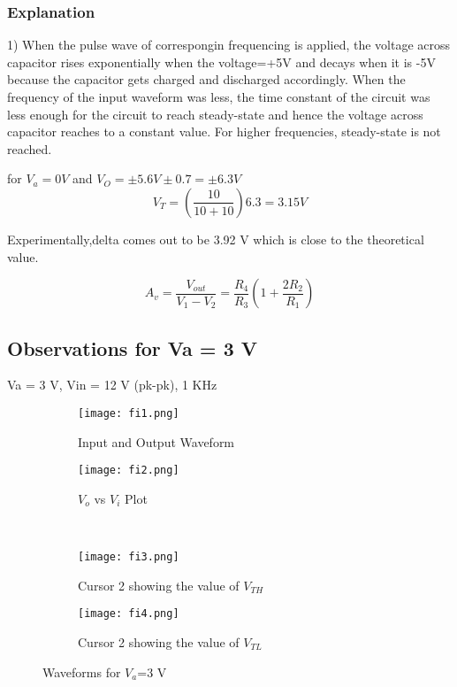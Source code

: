\documentclass[12pt]{article}
\begin{document}
\subsubsection{Explanation}

1) When the pulse wave of correspongin frequencing is applied, the voltage across capacitor rises exponentially when the voltage=+5V and decays when it is -5V because the capacitor gets charged and discharged accordingly. When the frequency of the input waveform was less, the time constant of the circuit was less enough for the circuit to reach steady-state and hence the voltage across capacitor reaches to a constant value. For higher frequencies, steady-state is not reached.

for $V_{a}=0 V$ and $V_{O}=\pm5.6 V \pm0.7 = \pm 6.3 V$
\begin{equation}V_{T}=(\frac{10}{10 + 10})6.3 = 3.15 V
\end{equation}

Experimentally,delta comes out to be 3.92 V which is close to the theoretical value.


\begin{equation}
    A_{v}=\frac{V_{out}}{V_{1}-V_{2}} = \frac{R_{4}}{R_{3}}(1 + \frac{2R_{2}}{R_{1}})
\end{equation}
\subsection{Observations for Va = 3 V}
Va = 3 V, Vin = 12 V (pk-pk), 1 KHz

\begin{figure}[h]
\centering
\begin{subfigure}{.5\textwidth}
  \centering
  \texttt{[image: fi1.png]}
  \caption{Input and Output Waveform}
  \label{fig:sub1}
\end{subfigure}%
\begin{subfigure}{.5\textwidth}
  \centering
  \texttt{[image: fi2.png]}
  \caption{$V_{o}$ vs $V_{i}$ Plot}
  \label{fig:sub1}
\end{subfigure}%
\\
\begin{subfigure}{.5\textwidth}
  \centering
  \texttt{[image: fi3.png]}
  \caption{Cursor 2 showing the value of $V_{TH}$}
  \label{fig:sub2}
\end{subfigure}%
\begin{subfigure}{.5\textwidth}
  \centering
  \texttt{[image: fi4.png]}
  \caption{Cursor 2 showing the value of $V_{TL}$}
  \label{fig:sub2}
\end{subfigure}
\caption{Waveforms for $V_{a}$=3 V}
\end{figure}
\end{document}
